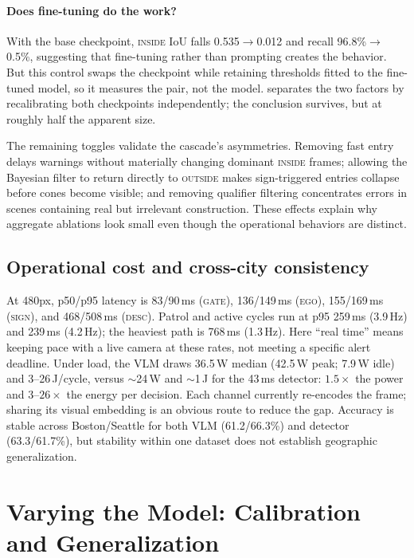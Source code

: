 \documentclass[journal]{IEEEtran}
\begin{document}
\paragraph{Does fine-tuning do the work?}  With the base checkpoint, \textsc{inside} IoU falls 0.535$\to$0.012 and recall 96.8\%$\to$0.5\%, suggesting that fine-tuning rather than prompting creates the behavior.  But this control swaps the checkpoint while retaining thresholds fitted to the fine-tuned model, so it measures the pair, not the model.   separates the two factors by recalibrating both checkpoints independently; the conclusion survives, but at roughly half the apparent size.

The remaining toggles validate the cascade's asymmetries.  Removing fast entry delays warnings without materially changing dominant \textsc{inside} frames; allowing the Bayesian filter to return directly to \textsc{outside} makes sign-triggered entries collapse before cones become visible; and removing qualifier filtering concentrates errors in scenes containing real but irrelevant construction.  These effects explain why aggregate ablations look small even though the operational behaviors are distinct.

\subsection{Operational cost and cross-city consistency}
\label{sec:cost}

At 480px, p50/p95 latency is 83/90\,ms (\textsc{gate}), 136/149\,ms (\textsc{ego}), 155/169\,ms (\textsc{sign}), and 468/508\,ms (\textsc{desc}).  Patrol and active cycles run at p95 259\,ms (3.9\,Hz) and 239\,ms (4.2\,Hz); the heaviest path is 768\,ms (1.3\,Hz).  Here ``real time'' means keeping pace with a live camera at these rates, not meeting a specific alert deadline.  Under load, the VLM draws 36.5\,W median (42.5\,W peak; 7.9\,W idle) and 3--26\,J/cycle, versus $\sim$24\,W and $\sim$1\,J for the 43\,ms detector: $1.5\times$ the power and $3$--$26\times$ the energy per decision.  Each channel currently re-encodes the frame; sharing its visual embedding is an obvious route to reduce the gap.  Accuracy is stable across Boston/Seattle for both VLM (61.2/66.3\%) and detector (63.3/61.7\%), but stability within one dataset does not establish geographic generalization.

\section{Varying the Model: Calibration and Generalization}
\label{sec:worldmodel}
\end{document}
